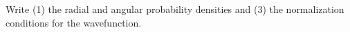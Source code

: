 

\vspace*{\fill}
\centering

Write (1) the radial and angular probability densities and (3) the normalization conditions for the wavefunction.

\centering
\vspace*{\fill}


